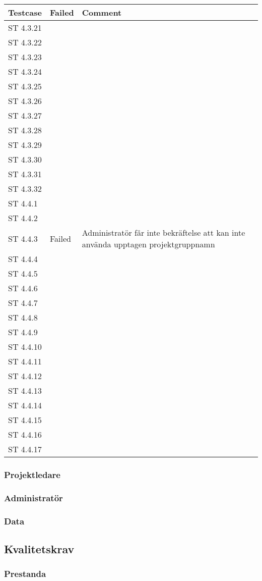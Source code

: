 \documentclass[a4paper]{article}
\begin{document}
\begin{tabular}{| l | l | p{11cm} |}
\hline
Testcase &  Failed & Comment\\
\hline
ST 4.3.21 & & \\
\hline
ST 4.3.22 & & \\
\hline
ST 4.3.23 & & \\
\hline
ST 4.3.24 & & \\
\hline
ST 4.3.25 & & \\
\hline
ST 4.3.26 & & \\
\hline
ST 4.3.27 & & \\
\hline
ST 4.3.28 & & \\
\hline
ST 4.3.29 & & \\
\hline
ST 4.3.30 & & \\
\hline
ST 4.3.31 & & \\
\hline
ST 4.3.32 & & \\
\hline
ST 4.4.1 & & \\
\hline
ST 4.4.2 & & \\
\hline
ST 4.4.3 & Failed & Administratör får inte bekräftelse att kan inte använda upptagen projektgruppnamn \\
\hline
ST 4.4.4 & & \\
\hline
ST 4.4.5 & & \\
\hline
ST 4.4.6 & & \\
\hline
ST 4.4.7 & & \\
\hline
ST 4.4.8 & & \\
\hline
ST 4.4.9 & & \\
\hline
ST 4.4.10 & & \\
\hline
ST 4.4.11 & & \\
\hline
ST 4.4.12 & & \\
\hline
ST 4.4.13 & & \\
\hline
ST 4.4.14 & & \\
\hline
ST 4.4.15 & & \\
\hline
ST 4.4.16 & & \\
\hline
ST 4.4.17 & & \\
\hline
\end{tabular}





\subsubsection{Projektledare}

\subsubsection{Administratör}

\subsubsection{Data}


\subsection{Kvalitetskrav}

\subsubsection{Prestanda}

\end{document}
